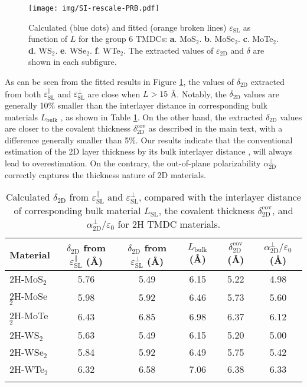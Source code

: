 \documentclass[manuscript=suppinfo,email=true,hyperref=true,keywords=false]{achemso}
\begin{document}
\begin{figure}[htbp]
  \centering
  \texttt{[image: img/SI-rescale-PRB.pdf]}
  \caption{ Calculated (blue dots) and fitted
    (orange broken lines) $\varepsilon_{\mathrm{SL}}$ as function of
    $L$ for the group 6 TMDCs:
    \textbf{a}. MoS$_{2}$. \textbf{b}. MoSe$_{2}$. \textbf{c}.
    MoTe$_{2}$. \textbf{d}. WS$_{2}$. \textbf{e}. WSe$_{2}$. \textbf{f}.
    WTe$_{2}$. The extracted values of $\varepsilon_{\mathrm{2D}}$ and
    $\delta$ are shown in each subfigure.}
  \label{fig:rescale-prb}
\end{figure}

As can be seen from the fitted results in Figure
\ref{fig:rescale-prb}, the values of $\delta_{\mathrm{2D}}$ extracted
from both $\varepsilon_{\mathrm{SL}}^{\parallel}$ and
$\varepsilon_{\mathrm{SL}}^{\perp}$ are close when $L> 15$
{\AA}. Notably, the $\delta_{\mathrm{2D}}$ values are generally 10\%
smaller than the interlayer distance in corresponding bulk materials
$L_{\mathrm{bulk}}$ , as shown in Table \ref{tab:delta-L-DFt}. On the
other hand, the extracted $\delta_{\mathrm{2D}}$ values are closer to
the covalent thickness $\delta_{\mathrm{2D}}^{\mathrm{cov}}$ as
described in the main text, with a difference generally smaller than
5\%. Our results indicate that the conventional estimation of the 2D
layer thickness by its bulk interlayer distance
\cite{Matthes_2016,Laturia_2018}, will always lead to
overestimation. On the contrary, the out-of-plane polarizability
$\alpha_{\mathrm{2D}}^{\perp}$ correctly captures the thickness nature
of 2D materials.

\begin{table}[htbp]
  \centering
  \begin{tabular}[htbp]{lccccc}
  \hline{}
  Material & $\delta_{\mathrm{2D}}$ from $\varepsilon_{\mathrm{SL}}^{\parallel}$ ({\AA}) & $\delta_{\mathrm{2D}}$ from $\varepsilon_{\mathrm{SL}}^{\perp}$ ({\AA})& $L_{\mathrm{bulk}}$ ({\AA}) & $\delta_{\mathrm{2D}}^{\mathrm{cov}}$ ({\AA}) & $\alpha_{\mathrm{2D}}^{\perp}/\varepsilon_{0}$ ({\AA})\\
  \hline{}
  2H-MoS$_{2}$ & 5.76 & 5.49 & 6.15 & 5.22 & 4.98\\
  2H-MoSe$_{2}$ & 5.98 & 5.92 & 6.46 &  5.73 & 5.60\\
  2H-MoTe$_{2}$ & 6.43 & 6.85 & 6.98 & 6.37 & 6.12\\
  2H-WS$_{2}$ & 5.63 & 5.49 & 6.15 & 5.20 & 5.00\\
  2H-WSe$_{2}$ & 5.84 & 5.92 & 6.49 & 5.75 & 5.42\\
  2H-WTe$_{2}$ & 6.32 & 6.58 & 7.06 & 6.38 & 6.33\\
  \hline{}
\end{tabular}

\caption{Calculated $\delta_{\mathrm{2D}}$ from
  $\varepsilon_{\mathrm{SL}}^{\parallel}$ and
  $\varepsilon_{\mathrm{SL}}^{\perp}$, compared with the interlayer
  distance of corresponding bulk material $L_{\mathrm{SL}}$, the
  covalent thickness $\delta_{\mathrm{2D}}^{\mathrm{cov}}$, and
  $\alpha_{\mathrm{2D}}^{\perp}/\varepsilon_{0}$ for 2H TMDC materials.}
\label{tab:delta-L-DFt}
\end{table}
\end{document}
